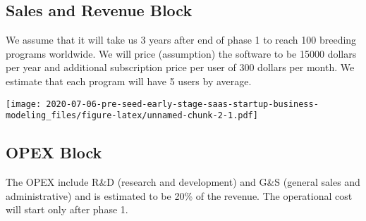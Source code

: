 \documentclass[
]{article}
\newenvironment{Shaded}{\begin{snugshade}}{\end{snugshade}}
\newcommand{\DataTypeTok}[1]{\textcolor[rgb]{0.13,0.29,0.53}{#1}}
\newcommand{\DecValTok}[1]{\textcolor[rgb]{0.00,0.00,0.81}{#1}}
\newcommand{\FloatTok}[1]{\textcolor[rgb]{0.00,0.00,0.81}{#1}}
\newcommand{\KeywordTok}[1]{\textcolor[rgb]{0.13,0.29,0.53}{\textbf{#1}}}
\newcommand{\NormalTok}[1]{#1}
\newcommand{\OperatorTok}[1]{\textcolor[rgb]{0.81,0.36,0.00}{\textbf{#1}}}
\newcommand{\StringTok}[1]{\textcolor[rgb]{0.31,0.60,0.02}{#1}}
\begin{document}
\hypertarget{sales-and-revenue-block}{%
\subsection{Sales and Revenue Block}\label{sales-and-revenue-block}}

We assume that it will take us 3 years after end of phase 1 to reach 100
breeding programs worldwide. We will price (assumption) the software to
be 15000 dollars per year and additional subscription price per user of
300 dollars per month. We estimate that each program will have 5 users
by average.

\begin{Shaded}
\end{Shaded}

\texttt{[image: 2020-07-06-pre-seed-early-stage-saas-startup-business-modeling\_files/figure-latex/unnamed-chunk-2-1.pdf]}

\hypertarget{opex-block}{%
\subsection{OPEX Block}\label{opex-block}}

The OPEX include R\&D (research and development) and G\&S (general sales
and administrative) and is estimated to be 20\% of the revenue. The
operational cost will start only after phase 1.

\begin{Shaded}
\end{Shaded}
\end{document}
